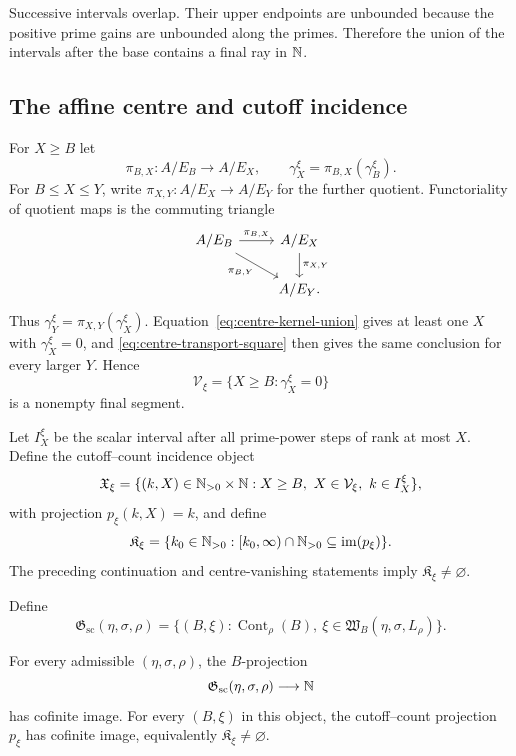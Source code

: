 Successive intervals overlap.  Their upper endpoints are unbounded because the positive prime gains are unbounded along the primes.  Therefore the union of the intervals after the base contains a final ray in $\mathbb N$.

\subsection{The affine centre and cutoff incidence}

For $X\ge B$ let
\[
\pi_{B,X}:A/E_B\longrightarrow A/E_X,
\qquad
\gamma_X^\xi=\pi_{B,X}(\gamma_B^\xi).
\]
For $B\le X\le Y$, write $\pi_{X,Y}:A/E_X\to A/E_Y$ for the further quotient.  Functoriality of quotient maps is the commuting triangle
\begin{equation}\label{eq:centre-transport-square}
\begin{tikzcd}
A/E_B \arrow[r,"{\pi_{B,X}}"] \arrow[dr,"{\pi_{B,Y}}"']
  & A/E_X \arrow[d,"{\pi_{X,Y}}"]\\
  & A/E_Y.
\end{tikzcd}
\end{equation}
Thus $\gamma_Y^\xi=\pi_{X,Y}(\gamma_X^\xi)$.  Equation~\eqref{eq:centre-kernel-union} gives at least one $X$ with $\gamma_X^\xi=0$, and \eqref{eq:centre-transport-square} then gives the same conclusion for every larger $Y$.  Hence
\[
\mathcal V_\xi=\{X\ge B:\gamma_X^\xi=0\}
\]
is a nonempty final segment.

Let $I_X^\xi$ be the scalar interval after all prime-power steps of rank at most $X$.  Define the cutoff--count incidence object
\begin{equation}\label{eq:term-k}
\mathfrak X_\xi
=
\{(k,X)\in\mathbb N_{>0}\times\mathbb N:
X\ge B,\ X\in\mathcal V_\xi,\ k\in I_X^\xi\},
\end{equation}
with projection $p_\xi(k,X)=k$, and define
\begin{equation}\label{eq:scalar-threshold-object}
\mathfrak K_\xi
=
\{k_0\in\mathbb N_{>0}:[k_0,\infty)\cap\mathbb N_{>0}\subseteq\operatorname{im}(p_\xi)\}.
\end{equation}
The preceding continuation and centre-vanishing statements imply $\mathfrak K_\xi\ne\varnothing$.

Define
\begin{equation}\label{eq:scalar-good-start-object}
\mathfrak G_{\mathrm{sc}}(\eta,\sigma,\rho)
=
\{(B,\xi):\operatorname{Cont}_\rho(B),\ \xi\in\mathfrak W_B(\eta,\sigma,L_\rho)\}.
\end{equation}

\begin{theorem}\label{thm:scalar-terminality}
For every admissible $(\eta,\sigma,\rho)$, the $B$-projection
\[
\mathfrak G_{\mathrm{sc}}(\eta,\sigma,\rho)\longrightarrow\mathbb N
\]
has cofinite image.  For every $(B,\xi)$ in this object, the cutoff--count projection $p_\xi$ has cofinite image, equivalently $\mathfrak K_\xi\ne\varnothing$.
\end{theorem}

